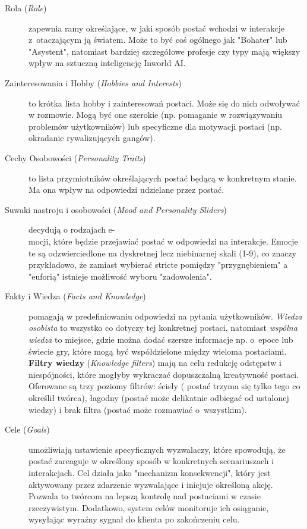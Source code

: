 \begin{description}
    \item[Rola (\textit{Role})] zapewnia ramy określające, w jaki sposób postać wchodzi w interakcje z~otaczającym ją
          światem. Może to być coś ogólnego jak "Bohater" lub "Asystent", natomiast bardziej szczegółowe
          profesje czy typy mają większy wpływ na sztuczną inteligencję Inworld AI\cite{inworld_docs}.

    \item[Zainteresowania i Hobby (\textit{Hobbies and Interests})] to krótka lista hobby i zainteresowań postaci. Może
          się do nich odwoływać w rozmowie. Mogą być one szerokie (np. pomaganie w rozwiązywaniu problemów
          użytkowników) lub specyficzne dla motywacji postaci (np. okradanie rywalizujących gangów)\cite{inworld_docs}.

    \item[Cechy Osobowości (\textit{Personality Traits})] to lista przymiotników określających postać będącą
          w konkretnym stanie. Ma ona wpływ na odpowiedzi udzielane przez postać\cite{inworld_docs}.

    \item[Suwaki nastroju i osobowości (\textit{Mood and Personality Sliders})] decydują o rodzajach e-\\
          mocji, które będzie przejawiać postać w odpowiedzi na interakcje. Emocje te są odzwierciedlone
          na dyskretnej lecz niebinarnej skali (1-9), co znaczy przykładowo, że zamiast wybierać
          stricte pomiędzy "przygnębieniem" a "euforią" istnieje możliwość wyboru "zadowolenia"\cite{inworld_docs}.

    \item[Fakty i Wiedza (\textit{Facts and Knowledge})] pomagają w predefiniowaniu odpowiedzi na pytania użytkowników.
          \textit{Wiedza osobista} to wszystko co dotyczy tej konkretnej postaci, natomiast \textit{wspólna wiedza} to miejsce, gdzie można
          dodać szersze informacje np. o~epoce lub świecie gry, które mogą być współdzielone między wieloma
          postaciami. \textbf{Filtry wiedzy} (\textit{Knowledge filters}) mają na celu redukcję odstępstw i niespójności, które
          mogłyby wykraczać dopuszczalną kreatywność postaci. Oferowane są trzy poziomy filtrów: ścisły (
          postać trzyma się tylko tego co określił twórca), łagodny (postać może delikatnie odbiegać od
          ustalonej wiedzy) i brak filtra (postać może rozmawiać o~wszystkim)\cite{inworld_docs}.

    \item[Cele (\textit{Goals})] umożliwiają ustawienie specyficznych wyzwalaczy, które spowodują, że postać
          zareaguje w określony sposób w konkretnych scenariuszach i interakcjach. Cel działa jako "mechanizm
          konsekwencji", który jest aktywowany przez zdarzenie wyzwalające i inicjuje określoną akcję. Pozwala
          to twórcom na lepszą kontrolę nad postaciami w czasie rzeczywistym. Dodatkowo, system celów
          monitoruje ich osiąganie, wysyłając wyraźny sygnał do klienta po zakończeniu celu\cite{inworld_docs}.


\end{description}
